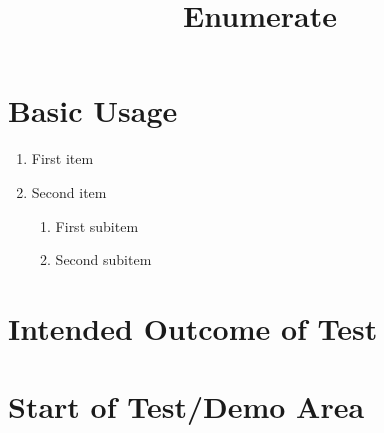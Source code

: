 \documentclass{ximera}
\title{Enumerate}
\begin{document}
\begin{abstract}
\end{abstract}
\maketitle




\section{Basic Usage}

\begin{enumerate}
    \item First item
    \item Second item
    \begin{enumerate}
        \item First subitem
        \item Second subitem
    \end{enumerate}
\end{enumerate}

\section{Intended Outcome of Test}

\section{Start of Test/Demo Area}
\end{document}
